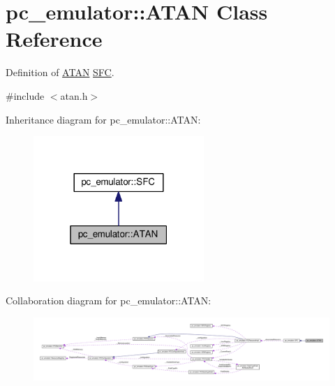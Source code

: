 \hypertarget{classpc__emulator_1_1ATAN}{}\section{pc\+\_\+emulator\+:\+:A\+T\+AN Class Reference}
\label{classpc__emulator_1_1ATAN}


Definition of \hyperlink{classpc__emulator_1_1ATAN}{A\+T\+AN} \hyperlink{classpc__emulator_1_1SFC}{S\+FC}.  




{\ttfamily \#include $<$atan.\+h$>$}



Inheritance diagram for pc\+\_\+emulator\+:\+:A\+T\+AN\+:
\nopagebreak
\begin{figure}[H]
\begin{center}
\leavevmode
\includegraphics[width=183pt]{classpc__emulator_1_1ATAN__inherit__graph}
\end{center}
\end{figure}


Collaboration diagram for pc\+\_\+emulator\+:\+:A\+T\+AN\+:
\nopagebreak
\begin{figure}[H]
\begin{center}
\leavevmode
\includegraphics[width=350pt]{classpc__emulator_1_1ATAN__coll__graph}
\end{center}
\end{figure}

